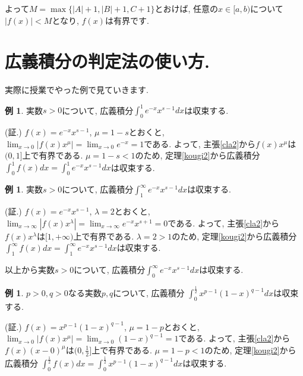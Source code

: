 \documentclass[dvipdfmx,a4paper,11pt]{article}
\theoremstyle{definition}
\newtheorem{exa}[thm]{例}
\begin{document}
よって$M = \max\{ |A|+1, |B|+1, C+1\}$とおけば, 任意の$x \in  [a,b) $について$|f(x)| < M$となり, $f(x)$は有界です.



\section{広義積分の判定法の使い方.}

実際に授業でやった例で見ていきます.

  \begin{exa}
実数$s>0$について, 広義積分$\int_{0}^{1} e^{-x}x^{s-1}dx$は収束する.

\hspace{-18pt}(証.)
$f(x) = e^{-x}x^{s-1}$, $\mu=1-s$とおくと, $\lim_{x \rightarrow 0} |f(x)x^{\mu}| =\lim_{x \rightarrow 0} e^{-x} =1$である. 
よって, 主張\ref{cla2}から$f(x)x^{\mu}$は$(0,1]$上で有界である.
$\mu=1-s<1$のため, 定理\ref{kougi2}から広義積分$\int_{0}^{1}f(x)dx=\int_{0}^{1} e^{-x}x^{s-1} dx$は収束する.
 \end{exa}
 
   \begin{exa}
実数$s>0$について, 広義積分$\int_{1}^{\infty} e^{-x}x^{s-1}dx$は収束する.

\hspace{-18pt}(証.)
$f(x) = e^{-x}x^{s-1}$, $\lambda=2$とおくと, $\lim_{x \rightarrow \infty} |f(x) x^{\lambda}| = \lim_{x \rightarrow \infty} e^{-x}x^{s+1} =0$である.
よって, 主張\ref{cla2}から$f(x)x^{\lambda}$は$[1,+\infty)$上で有界である.
$\lambda=2>1$のため, 定理\ref{kougi2}から広義積分$\int_{1}^{\infty} f(x)dx=\int_{1}^{\infty} e^{-x}x^{s-1}dx$は収束する.

 \end{exa}
 
 以上から実数$s>0$について, 広義積分$\int_{0}^{\infty} e^{-x}x^{s-1}dx $は収束する.
 
\begin{exa}
$p>0, q>0$なる実数$p,q$について, 広義積分
$\int^{\frac{1}{2}}_{0}x^{p-1}(1-x)^{q-1} dx$は収束する.

\hspace{-18pt}(証.)
$f(x) = x^{p-1}(1-x)^{q-1}$, $\mu=1-p$とおくと, $\lim_{x \rightarrow 0} |f(x) x^{\mu}| =\lim_{x \rightarrow 0} (1-x)^{q-1}=1$である.
よって, 主張\ref{cla2}から$f(x)(x-0)^{\mu}$は$(0, \frac{1}{2}]$上で有界である.
$\mu=1-p<1$のため, 定理\ref{kougi2}から広義積分
$\int_{0}^{\frac{1}{2}}f(x) dx = \int^{\frac{1}{2}}_{0}x^{p-1}(1-x)^{q-1} dx$は収束する.

 \end{exa}
 
\end{document}
